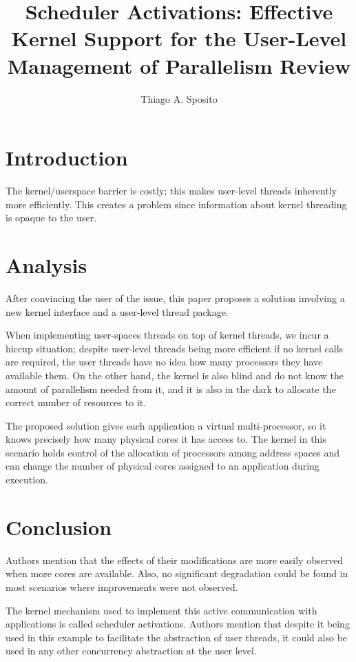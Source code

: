 \documentclass[12pt]{article}
\title{Scheduler Activations: Effective Kernel Support for the User-Level Management of Parallelism Review}
\author{Thiago A. Sposito\inst{1} }
\begin{document}
 

\maketitle


\section{Introduction}
The kernel/userspace barrier is costly; this makes user-level threads inherently more efficiently. This creates a problem since information about kernel threading is opaque to the user.\cite{anderson1992scheduler} 
\section{Analysis}
After convincing the user of the issue, this paper proposes a solution involving a new kernel interface and a user-level thread package.

When implementing user-spaces threads on top of kernel threads, we incur a hiccup situation;  despite user-level threads being more efficient if no kernel calls are required, the user threads have no idea how many processors they have available them. On the other hand, the kernel is also blind and do not know the amount of parallelism needed from it, and it is also in the dark to allocate the correct number of resources to it.

The proposed solution gives each application a  virtual multi-processor, so it knows precisely how many physical cores it has access to. The kernel in this scenario holds control of the allocation of processors among address spaces and can change the number of physical cores assigned to an application during execution.

\section{Conclusion}
Authors mention that the effects of their modifications are more easily observed when more cores are available. Also, no significant degradation could be found in most scenarios where improvements were not observed.

The kernel mechanism used to implement this active communication with applications is called scheduler activations. Authors mention that despite it being used in this example to facilitate the abstraction of user threads, it could also be used in any other concurrency abstraction at the user level.


\end{document}
